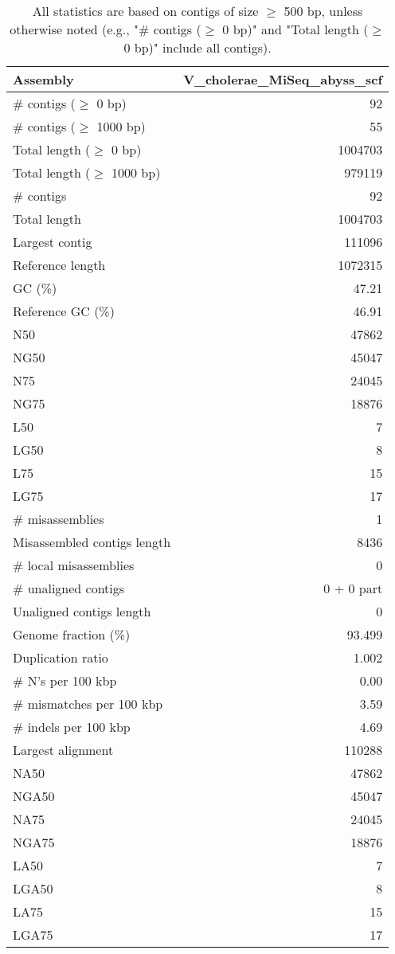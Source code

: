 \documentclass[12pt,a4paper]{article}
\begin{document}
\begin{table}[ht]
\begin{center}
\caption{All statistics are based on contigs of size $\geq$ 500 bp, unless otherwise noted (e.g., "\# contigs ($\geq$ 0 bp)" and "Total length ($\geq$ 0 bp)" include all contigs).}
\begin{tabular}{|l*{1}{|r}|}
\hline
Assembly & V\_cholerae\_MiSeq\_abyss\_scf \\ \hline
\# contigs ($\geq$ 0 bp) & 92 \\ \hline
\# contigs ($\geq$ 1000 bp) & 55 \\ \hline
Total length ($\geq$ 0 bp) & 1004703 \\ \hline
Total length ($\geq$ 1000 bp) & 979119 \\ \hline
\# contigs & 92 \\ \hline
Total length & 1004703 \\ \hline
Largest contig & 111096 \\ \hline
Reference length & 1072315 \\ \hline
GC (\%) & 47.21 \\ \hline
Reference GC (\%) & 46.91 \\ \hline
N50 & 47862 \\ \hline
NG50 & 45047 \\ \hline
N75 & 24045 \\ \hline
NG75 & 18876 \\ \hline
L50 & 7 \\ \hline
LG50 & 8 \\ \hline
L75 & 15 \\ \hline
LG75 & 17 \\ \hline
\# misassemblies & 1 \\ \hline
Misassembled contigs length & 8436 \\ \hline
\# local misassemblies & 0 \\ \hline
\# unaligned contigs & 0 + 0 part \\ \hline
Unaligned contigs length & 0 \\ \hline
Genome fraction (\%) & 93.499 \\ \hline
Duplication ratio & 1.002 \\ \hline
\# N's per 100 kbp & 0.00 \\ \hline
\# mismatches per 100 kbp & 3.59 \\ \hline
\# indels per 100 kbp & 4.69 \\ \hline
Largest alignment & 110288 \\ \hline
NA50 & 47862 \\ \hline
NGA50 & 45047 \\ \hline
NA75 & 24045 \\ \hline
NGA75 & 18876 \\ \hline
LA50 & 7 \\ \hline
LGA50 & 8 \\ \hline
LA75 & 15 \\ \hline
LGA75 & 17 \\ \hline
\end{tabular}
\end{center}
\end{table}
\end{document}
